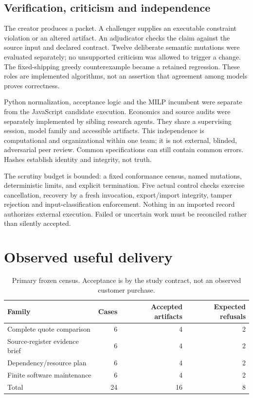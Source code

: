 \subsection{Verification, criticism and independence}

The creator produces a packet. A challenger supplies an executable constraint violation or an altered artifact. An adjudicator checks the claim against the source input and declared contract. Twelve deliberate semantic mutations were evaluated separately; no unsupported criticism was allowed to trigger a change. The fixed-shipping greedy counterexample became a retained regression. These roles are implemented algorithms, not an assertion that agreement among models proves correctness.

Python normalization, acceptance logic and the MILP incumbent were separate from the JavaScript candidate execution. Economics and source audits were separately implemented by sibling research agents. They share a supervising session, model family and accessible artifacts. This independence is computational and organizational within one team; it is not external, blinded, adversarial peer review. Common specifications can still contain common errors. Hashes establish identity and integrity, not truth.

The scrutiny budget is bounded: a fixed conformance census, named mutations, deterministic limits, and explicit termination. Five actual control checks exercise cancellation, recovery by a fresh invocation, export/import integrity, tamper rejection and input-classification enforcement. Nothing in an imported record authorizes external execution. Failed or uncertain work must be reconciled rather than silently accepted.

\section{Observed useful delivery}

\begin{table}[htbp]\centering\small
\caption{Primary frozen census. Acceptance is by the study contract, not an observed customer purchase.}\label{tab:primary}
\begin{tabularx}{\linewidth}{@{}Xrrr@{}}\toprule
Family & Cases & Accepted artifacts & Expected refusals\\\midrule
Complete quote comparison & 6 & 4 & 2\\
Source-register evidence brief & 6 & 4 & 2\\
Dependency/resource plan & 6 & 4 & 2\\
Finite software maintenance & 6 & 4 & 2\\\midrule
Total & 24 & 16 & 8\\\bottomrule
\end{tabularx}
\end{table}

